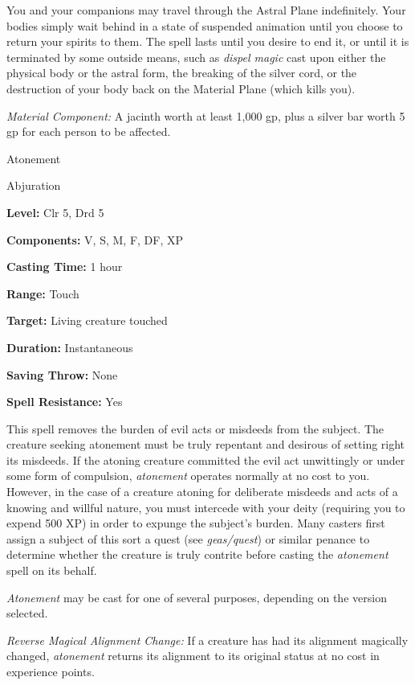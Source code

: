 \documentclass{article}
\begin{document}
You and your companions may travel through the Astral Plane indefinitely. Your 
bodies simply wait behind in a state of suspended animation until you choose to 
return your spirits to them. The spell lasts until you desire to end it, or until 
it is terminated by some outside means, such as \textit{dispel magic }cast upon 
either the physical body or the astral form, the breaking of the silver cord, or 
the destruction of your body back on the Material Plane (which kills you).

\textit{Material Component: }A jacinth worth at least 1,000 gp, plus a silver bar 
worth 5 gp for each person to be affected.

\vspace{12pt}
Atonement

Abjuration

\textbf{Level:} Clr 5, Drd 5

\textbf{Components:} V, S, M, F, DF, XP

\textbf{Casting Time:} 1 hour

\textbf{Range:} Touch

\textbf{Target:} Living creature touched

\textbf{Duration:} Instantaneous

\textbf{Saving Throw:} None

\textbf{Spell Resistance:} Yes

This spell removes the burden of evil acts or misdeeds from the subject. The creature 
seeking atonement must be truly repentant and desirous of setting right its misdeeds. 
If the atoning creature committed the evil act unwittingly or under some form of 
compulsion, \textit{atonement }operates normally at no cost to you. However, in 
the case of a creature atoning for deliberate misdeeds and acts of a knowing and 
willful nature, you must intercede with your deity (requiring you to expend 500 
XP) in order to expunge the subject's burden. Many casters first assign a subject 
of this sort a quest (see \textit{geas/quest}) or similar penance to determine 
whether the creature is truly contrite before casting the \textit{atonement }spell 
on its behalf.

\textit{Atonement }may be cast for one of several purposes, depending on the version 
selected.

\textit{Reverse Magical Alignment Change: }If a creature has had its alignment 
magically changed, \textit{atonement }returns its alignment to its original status 
at no cost in experience points.
\end{document}
